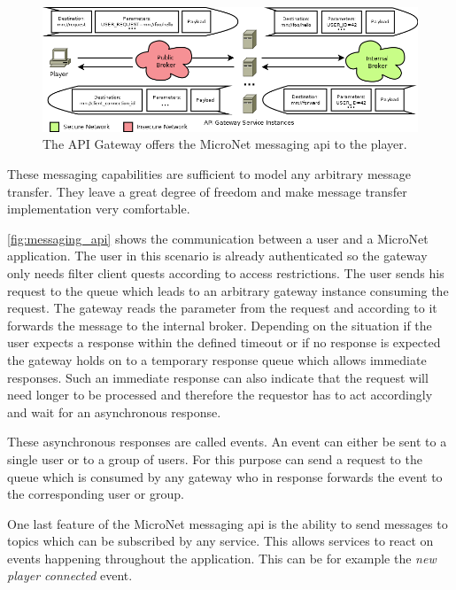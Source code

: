 \begin{figure}
	\centering
	\hspace*{-1.5cm}
	\includegraphics[width=1.2\textwidth]{images/architecture/MessagingAPI}
	\caption{The API Gateway offers the MicroNet messaging \gls{api} to the player.}
	\label{fig:messaging_api}
\end{figure}

These messaging capabilities are sufficient to model any arbitrary message
transfer. They leave a great degree of freedom and make message transfer
implementation very comfortable. 

\autoref{fig:messaging_api} shows the communication between a user and a
MicroNet application. The user in this scenario is already authenticated so the
gateway only needs filter client quests according to access restrictions. The
user sends his request to the  queue which leads to an
arbitrary gateway instance consuming the request. The gateway reads the
 parameter from the request and according to it forwards the
message to the internal broker. Depending on the situation if the user expects a
response within the defined timeout or if no response is expected the
gateway holds on to a temporary response queue which allows immediate responses.
Such an immediate response can also indicate that the request will need longer
to be processed and therefore the requestor has to act accordingly and wait for
an asynchronous response.

These asynchronous responses are called events. An event can either be sent to a
single user or to a group of users. For this purpose \mss{} can send a request
to the  queue which is consumed by any gateway who in
response forwards the event to the corresponding user or group.

One last feature of the MicroNet messaging \gls{api} is the ability to send messages
to topics which can be subscribed by any service. This allows services to react
on events happening throughout the application. This can be for example the
\textit{new player connected} event.











